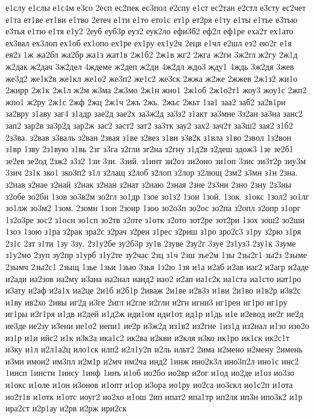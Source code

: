 е1слу
е1слы
е1с4м
е3со
2есп
ес2пек
ес3пол
е2спу
е1ст
ес2тан
е2стл
е3сту
ес2чет
е1та
ет1ве
ет1ви
е1тво
2етеч
е1ти
е1то
ето1с
ет1р
ет2ря
е1ту
е1ты
е1тье
е3тью
е3тья
е1тю
е1тя
е1у2
2еуб
еуб3р
еуз2
еук2ло
ефи3б2
еф2л
еф1ре
еха2т
ех1ато
ех3вал
ех3лоп
ех1об
ех1опо
ех1ре
ех1ру
ех1у2ч
2ецв
е1чл
е2шл
еэ2
ею2г
е1я
ея2з
1ж
жа2бл
жа2бр
жа1з
жат1в
2ж1б2
2ж1в
жг2
2жга
ж2ги
3ж2гл
ж2гу
2ж1д
ж2дак
ж2дач
3ж2дел
4ждеме
ж2деп
ж2ди
4ж2дл
ждо3
жду1
4ждь
3ж2дя
3жев
же3д2
же1к2в
же1кл
же1о2
же3п2
же1с2
же3ск
2жжа
ж2же
2жжев
2ж1з2
жи1о
2жирр
2ж1к
2ж1л
ж2м
ж3ма
2ж3мо
2ж1н
жно1
2ж1об
2ж1о2т1
жоу3
жоу1с
2жп2
жпо1
ж2ру
2ж1с
2жф
2жц
2ж1ч
2жъ
2жь.
2жьс
2жьт
1за1
заа2
заб2
за2в1ри
за2вру
з1аву
заг4
з1адр
зае2д
зае2х
за3ж2д
за3з2
з1акт
за3мне
3з2ан
за3на
занс2
зап2
зар2в
за3р2д
зар2ж
зас2
заст2
зат2
за3тк
зау2
зах2
зач2т
за3ш2
зая2
з1б2
2з3ва.
з2вав
з3валь
з2ван
2звая
з1ве
з2вез
з1ви
з3в2к
з1вла
з1во
2звол
1з2вон
з1вр
1зву
2з1вую
з1вь
2зг
з3га
з2гли
зг2на
з2гну
з1д2в
з2деш
здож3
1зе
зе2б1
зе2ев
зе2од
2зж2
з3з2
1зи
3зи.
3зий.
з1инт
зи2оз
зи2оно
зи1оп
3зис
зи3т2р
зиу3м
3зич
2з1к
зко1
зко3п2
з1л
з2лащ
з2лоб
з2лоп
з2лор
з2лющ
2зм2
з3мн
з1н
2зна.
з2нав
з2нае
з2най
з2нак
з2нан
з2нат
з2наю
2зная
2зне
2з3ни
2зно
2зну
2з3ны
з2обе
зо2би
1зов
зо3в2м
зо2гл
зо1др
1зое
зо1з2
1зои
1зой.
1зок.
з1окс
1зол2
зо1лг
зо1лж
зо3м2
1зом.
2зомн
1зон
2зонр
1зоо
зо2о3п
зо2ос
зо2па
з2опл
з2опр
з1орг
1з2о3ре
зос2
з1осн
зо1сп
зо2тв
з2оте
з1отк
з2ото
зот2ре
зот2ри
1зох
зош2
зо2ши
1зоэ
1зою
з1ра
з2рак
зра2с
з2рач
з2рен
з1рес
з2риш
з1ро
зро2с3
з1ру
з2рю
з1ря
2з1с
2зт
з1ти
1зу
3зу.
2з1у2бе
зу2б3р
зу1в
2зуве
2зу2г
3зуе
2з1уз3
2зу1к
3зуме
з1у2мо
2зуп
зу2пр
з1урб
з1у2те
зу2час
2зц
з1ч
2зш
зъе2м
1зы
2зы2г1
зы2з
2зыме
2зымч
2зы2с1
2зыщ
1зье
1зьи
1зью
3зья
1з2ю
1зя
и1а
и2аб
и2ав
иаг2
и2агр
и2аде
и2ади
иа2зов
иа2му
и3ана
иа2нал
ианд2
иао2
и2ап
иа1с2к
иа1ста
иа1сто
иат1ро
и3ату
и2аф
и2а1х
иа2це
2и1б
и2б1р
2иваж
2и1ве
и2в3з
и1ви
2и1во
и1в2р
и3в2с
и1ву
ив2хо
2ивы
иг2д
и3ге
2игл
и2гле
и2гли
и2гн
игни3
иг1рен
иг1ро
иг1ру
иг1ры
и2г1ря
и1дв
и2дей
и1д2ж
иди1ом
иди1от
ид1р
и1дь
и1е
и2евод
ие2г
ие2д
ие3де
ие2зу
и3ени
ие1о2
иепи1
ие2р
и3ж2д
из1в2
из2гне
1из1д
из2нал
и1зо
изо2о
из1р
и1и
ийс2
и1к
и3к2а
ика1с2
ик2ва
и2кви
и2кля
и3ко
ик1ро
ик1ск
ик2с1т
и3ку
и1л
и2л1а2ц
ило1ск
илп2
и2л1у2п
и2ль
ильт2
2има
и2мено
и2мену
2имень
и3ми
имои2
им3пл
и2м1р
и2мч
им2ча
инд2
1инж
ино2к3л
ино3п2л
ино1с
инс2
1инсп
1инсти
1инсу
1инф
1инъ
и1об
ио2бо
ио2вр
и2ог
и1од
ио2де
и1оз
ио3зо
и1окс
и1оле
и1он
и3онов
и1опт
и1ор
и3ора
ио1ру
ио2са
ио3скл
ио1с2п
и1ота
ио2т1в
и1отк
и1отс
иоуг2
ио2хо
и1ош
2ип
ипат2
ипа1тр
ип2ля
ип3н
ипо3к2
и1р
ира2ст
и2р1ау
и2рв
и2рж
ири2ск
